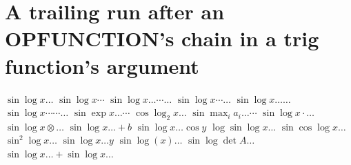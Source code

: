 \documentclass{article}
\begin{document}
\section{A trailing run after an OPFUNCTION's chain in a trig function's argument}
$\sin\log x\ldots$ $\sin\log x\cdots$ $\sin\log x\ldots\cdots\ldots$ $\sin\log x\cdots\ldots$ $\sin\log x\ldots\ldots$
$\sin\log x\cdots\cdots\ldots$ $\sin\exp x\ldots\cdots$ $\cos\log_2 x\ldots$ $\sin\max_i a_i\ldots\cdots$ $\sin\log x\cdot\ldots$
$\sin\log x\otimes\ldots$ $\sin\log x\ldots+b$ $\sin\log x\ldots\cos y$ $\log\sin\log x\ldots$ $\sin\cos\log x\ldots$
$\sin^2\log x\ldots$ $\sin\log x\ldots y$ $\sin\log(x)\ldots$ $\sin\log\det A\ldots$ $\sin\log x\ldots+\sin\log x\ldots$

\end{document}
